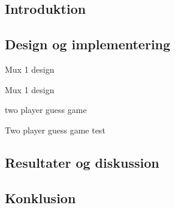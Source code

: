 \documentclass[../journal.tex]{subfiles}
\begin{document}
\subsection{Introduktion}

\subsection{Design og implementering}

\begin{table}[H]
    \centering
      \framebox{
        \rule{8pt}{0pt}
          
  }
  \caption{Mux 1 design}	
  \label{src:mux1}
\end{table}

\begin{table}[H]
    \centering
      \framebox{
        \rule{8pt}{0pt}
          
  }
  \caption{Mux 1 design}	
  \label{src:mux2}
\end{table}

\begin{table}[H]
    \centering
      \framebox{
        \rule{8pt}{0pt}
          
  }
  \caption{two player guess game}	
  \label{src:two_guess}
\end{table}

\begin{table}[H]
    \centering
      \framebox{
        \rule{8pt}{0pt}
          
  }
  \caption{Two player guess game test}	
  \label{src:two_guess_test}
\end{table}


\subsection{Resultater og diskussion}


\subsection{Konklusion}
\end{document}
